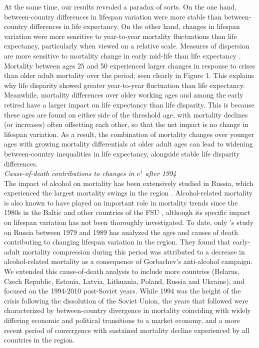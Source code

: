\documentclass{article}
\begin{document}
\begin{spacing}{1.5}
At the same time, our results revealed a paradox of sorts. On the one hand, between-country differences in lifespan variation were more stable than between-country differences in life expectancy. On the other hand, changes in lifespan variation were more sensitive to year-to-year mortality fluctuations than life expectancy, particularly when viewed on a relative scale. Measures of dispersion are more sensitive to mortality change in early mid-life than life expectancy \citep{vanraalte2013}. Mortality between ages 25 and 50 experienced larger changes in response to crises than older adult mortality over the period, seen clearly in Figure 1. This explains why life disparity showed greater year-to-year fluctuation than life expectancy. Meanwhile, mortality differences over older working ages and among the early retired have a larger impact on life expectancy than life disparity. This is because these ages are found on either side of the threshold age, with mortality declines (or increases) often offsetting each other, so that the net impact is no change in lifespan variation. As a result, the combination of mortality changes over younger ages with growing mortality differentials at older adult ages can lead to widening between-country inequalities in life expectancy, alongside stable life disparity differences.
\\

\emph{Cause-of-death contributions to changes in $e^\dagger$ after 1994}\\

The impact of alcohol on mortality has been extensively studied in Russia, which experienced the largest mortality swings in the region \citep{leon1997huge,rehm2007, shkolnikov2013components,shkolnikov2001}. Alcohol-related mortality is also known to have played an important role in mortality trends since the 1980s in the Baltic and other countries of the FSU \citep{rehm2007,jasilionis2011}, 
although its specific impact on lifespan variation has not been thoroughly investigated. To date, only \citet{shkolnikov2003}'s study on Russia between 1979 and 1989 has analyzed the ages and causes of death contributing to changing lifespan variation in the region. They found that early-adult mortality compression during this period was attributed to a decrease in alcohol-related mortality as a consequence of Gorbachev's anti-alcohol campaign. We extended this cause-of-death analysis to include more countries (Belarus, Czech Republic, Estonia, Latvia, Lithuania, Poland, Russia and Ukraine), and focused on the 1994-2010 post-Soviet years. While 1994 was the height of the crisis following the dissolution of the Soviet Union, the years that followed were characterized by between-country divergence in mortality coinciding with widely differing economic and political transitions to a market economy, and a more recent period of convergence with sustained mortality decline experienced by all countries in the region.\\


\end{spacing}
\end{document}
